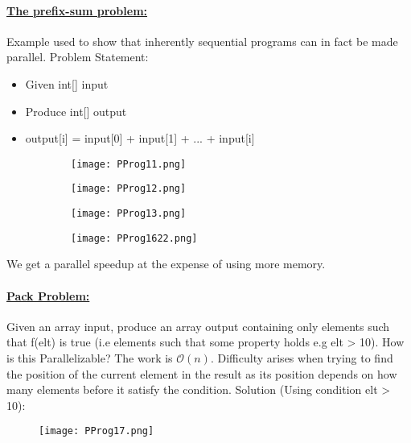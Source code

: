 \documentclass[8pt]{extreport}
\begin{document}
\paragraph{\underline{The prefix-sum problem:}} Example used to show that inherently sequential programs can in fact be made parallel. 
Problem Statement:
\begin{itemize}
\item Given int[] input
\item Produce int[] output
\item output[i] = input[0] + input[1] + ... + input[i]
\end{itemize}
\begin{figure}[h!]
	\centering
	\begin{subfigure}[b]{0.49\linewidth}
	\texttt{[image: PProg11.png]}
	\caption{}
	\label{PProg11}
	\end{subfigure}
	\begin{subfigure}[b]{0.49\linewidth}
	\texttt{[image: PProg12.png]}
	\caption{}
	\label{PProg12}
	\end{subfigure}
	
\end{figure}
\begin{figure}[h!]
	\centering
	\begin{subfigure}[b]{0.49\linewidth}
	\texttt{[image: PProg13.png]}
	\caption{}
	\label{PProg13}
	\end{subfigure}
	\begin{subfigure}[b]{0.49\linewidth}
	\texttt{[image: PProg1622.png]}
	\caption{}
	\label{PProg1622}
	\end{subfigure}
\end{figure}
We get a parallel speedup at the expense of using more memory.

\paragraph{\underline{Pack Problem:}} Given an array input, produce an array output containing only elements such that f(elt) is true (i.e elements such that some property holds e.g elt > 10). How is this Parallelizable? The work is $\mathcal{O}(n)$. Difficulty arises when trying to find the position of the current element in the result as its position depends on how many elements before it satisfy the condition. Solution (Using condition elt > 10):
\begin{figure}[h!]
	\centering
	\texttt{[image: PProg17.png]}
	\caption{}
	\label{PProg17}
\end{figure}
\end{document}
